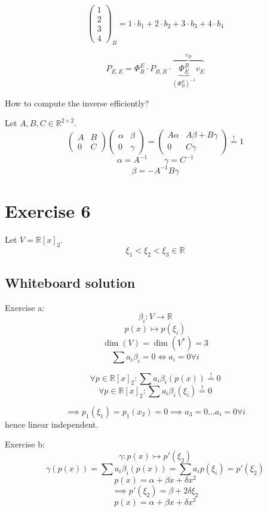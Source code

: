 \documentclass[a4paper]{article}
\theoremstyle{definition}
\begin{document}
\[ \begin{pmatrix} 1 \\ 2 \\ 3 \\ 4 \end{pmatrix}_B = 1 \cdot b_1 + 2 \cdot b_2 + 3 \cdot b_3 + 4 \cdot b_4 \]

\[ P_{E,E} = \Phi_B^E \cdot P_{B,B} \cdot \overbrace{\underbrace{\Phi_{E}^B}_{(\Phi_B^E)^{-1}} v_E}^{v_B} \]



How to compute the inverse efficiently?

Let $A, B, C \in \mathbb R^{2 \times 2}$.
\[
  \begin{pmatrix}
    A & B \\
    0 & C
  \end{pmatrix} \begin{pmatrix}
    \alpha & \beta \\
    0 & \gamma
  \end{pmatrix}
  = \begin{pmatrix}
    A \alpha & A \beta + B \gamma \\
    0 & C \gamma
  \end{pmatrix}
  \stackrel!= \mathcal 1
\]
\[ \alpha = A^{-1} \qquad \gamma = C^{-1} \]
\[ \beta = -A^{-1} B \gamma \]

\section*{Exercise 6}
\begin{ex}
  Let $V = \mathbb R[x]_2$.
  \[ \xi_1 < \xi_2 < \xi_3 \in \mathbb R \]
\end{ex}

\subsection{Whiteboard solution}

Exercise a:
\[ \beta_i: V \to \mathbb R \]
\[ p(x) \mapsto p(\xi_i) \]
\[ \dim(V) = \dim(V^*) = 3 \]
\[ \sum a_i \beta_i =0 \iff a_i = 0 \forall i \]

\[ \forall p \in \mathbb R[x]_2: \sum a_i \beta_i(p(x)) \stackrel!= 0 \]
\[ \forall p \in \mathbb R[x]_2: \sum a_i \beta_i(\xi_i) \stackrel!= 0 \]

\[ \implies p_1(\xi_1) = p_1(x_2) = 0 \implies a_3 = 0 \dots a_i = 0 \forall i \]
hence linear independent.

Exercise b:
\[ \gamma: p(x) \mapsto p'(\xi_2) \]
\[ \gamma(p(x)) = \sum a_i \beta_i(p(x)) = \sum a_i p(\xi_i) = p'(\xi_2) \]
\[ p(x) = \alpha + \beta x + \delta x^2 \]
\[ \implies p'(\xi_2) = \beta + 2 \delta \xi_2 \]
\[ p(x) = \alpha + \beta x + \delta x^2 \]
\end{document}
